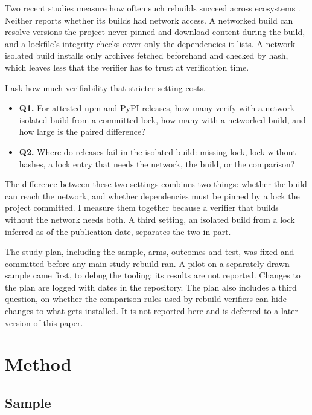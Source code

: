 \documentclass[11pt]{article}
\begin{document}
Two recent studies measure how often such rebuilds succeed across
ecosystems \cite{dietrich2026,solarin2026}. Neither reports whether its
builds had network access. A networked build
can resolve versions the project never pinned and download content during
the build, and a lockfile's integrity checks cover only the dependencies
it lists. A network-isolated build installs only archives fetched
beforehand and checked by hash, which leaves less that the verifier has
to trust at verification time.

I ask how much verifiability that stricter setting costs.

\begin{itemize}
\item \textbf{Q1.} For attested npm and PyPI releases, how many verify
with a network-isolated build from a committed lock, how many with a
networked build, and how large is the paired difference?
\item \textbf{Q2.} Where do releases fail in the isolated build: missing
lock, lock without hashes, a lock entry that needs the network, the build,
or the comparison?
\end{itemize}

The difference between these two settings combines two things: whether
the build can reach the network, and whether dependencies must be pinned
by a lock the project committed. I measure them together because a
verifier that builds without the network needs both. A third setting, an isolated build from a lock inferred as of
the publication date, separates the two in part.

The study plan, including the sample, arms, outcomes and test, was fixed
and committed before any main-study rebuild ran. A pilot on a separately
drawn sample came first, to debug the tooling; its results are not
reported. Changes to the plan are logged with dates in the repository.
The plan also includes a third question, on whether the comparison rules
used by rebuild verifiers can hide changes to what gets installed. It is
not reported here and is deferred to a later version of this paper.

\section{Method}

\subsection{Sample}
\end{document}
